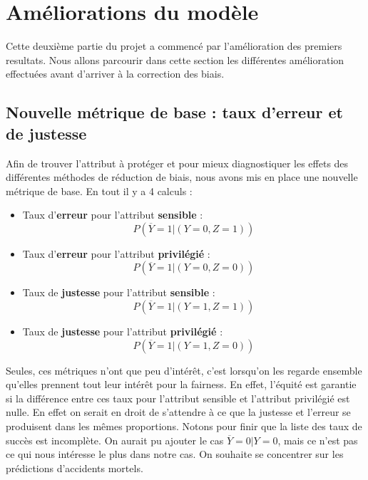 \documentclass{article}
\begin{document}
    \section{Améliorations du modèle}
    Cette deuxième partie du projet a commencé par l'amélioration des premiers resultats. Nous allons parcourir 
    dans cette section les différentes amélioration effectuées avant d'arriver à la correction des biais.

    \subsection{Nouvelle métrique de base : taux d'erreur et de justesse}

    Afin de trouver l'attribut à protéger et pour mieux diagnostiquer les effets des différentes méthodes de réduction de
    biais, nous avons mis en place une nouvelle métrique de base. En tout il y a 4 calculs : 

    \begin{itemize}
        \item Taux d'\textbf{erreur} pour l'attribut \textbf{sensible} : \[ P(\overline{Y}=1| (Y=0, Z=1)) \]
        \item Taux d'\textbf{erreur} pour l'attribut \textbf{privilégié} : \[ P(\overline{Y}=1| (Y=0, Z=0)) \]
        \item Taux de \textbf{justesse} pour l'attribut \textbf{sensible} : \[ P(\overline{Y}=1| (Y=1, Z=1)) \]
        \item Taux de \textbf{justesse} pour l'attribut \textbf{privilégié} : \[ P(\overline{Y}=1| (Y=1, Z=0)) \]
    \end{itemize}

    Seules, ces métriques n'ont que peu d'intérêt, c'est lorsqu'on les regarde ensemble qu'elles prennent tout leur intérêt pour 
    la fairness. En effet, l'équité est garantie si la différence entre ces taux pour l'attribut sensible et l'attribut privilégié 
    est nulle. En effet on serait en droit de s'attendre à ce que la justesse et l'erreur se produisent dans les mêmes proportions. 
    Notons pour finir que la liste des taux de succès est incomplète. On aurait pu ajouter le cas $\overline{Y}=0| Y=0$, mais ce n'est pas ce qui 
    nous intéresse le plus dans notre cas. On souhaite se concentrer sur les prédictions d'accidents mortels.
\end{document}
